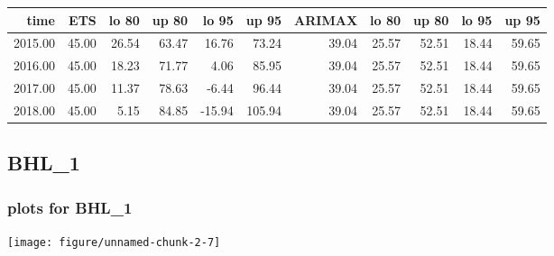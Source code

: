 \documentclass[10pt,a4paper]{article}\usepackage[]{graphicx}\usepackage[]{color}
\makeatletter
\def\maxwidth{ %
  \ifdim\Gin@nat@width>\linewidth
    \linewidth
  \else
    \Gin@nat@width
  \fi
}
\newcommand{\AaA}{\_}
\makeatother
\begin{document}
\begin{table}[ht]
\centering
\begin{tabular}{rrrrrrrrrrr}
  \hline
time & ETS  & lo 80 & up 80 & lo 95 & up 95 & ARIMAX  & lo 80 & up 80 & lo 95 & up 95 \\ 
  \hline
2015.00 & 45.00 & 26.54 & 63.47 & 16.76 & 73.24 & 39.04 & 25.57 & 52.51 & 18.44 & 59.65 \\ 
  2016.00 & 45.00 & 18.23 & 71.77 & 4.06 & 85.95 & 39.04 & 25.57 & 52.51 & 18.44 & 59.65 \\ 
  2017.00 & 45.00 & 11.37 & 78.63 & -6.44 & 96.44 & 39.04 & 25.57 & 52.51 & 18.44 & 59.65 \\ 
  2018.00 & 45.00 & 5.15 & 84.85 & -15.94 & 105.94 & 39.04 & 25.57 & 52.51 & 18.44 & 59.65 \\ 
   \hline
\end{tabular}
\end{table}

\newpage
\subsection{BHL\AaA 1}
\subsubsection{plots for BHL\AaA 1}

\texttt{[image: figure/unnamed-chunk-2-7]} 

\newpage
\end{document}
